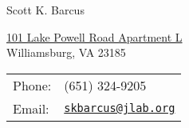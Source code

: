 \documentclass[letterpaper,10pt]{article}
\def\name{Scott K. Barcus}
\begin{document}
\renewcommand{\baselinestretch}{0.0}{
{\huge \name}


\vspace{0.25in}

\begin{minipage}{0.45\linewidth}
  \href{http://www.wm.edu/}{101 Lake Powell Road Apartment L} \\
  Williamsburg, VA 23185 \\
\end{minipage}
\begin{minipage}{0.45\linewidth}
  \begin{tabular}{ll}
    Phone: & (651) 324-9205 \\
    Email: & \href{mailto:me@email.wm.edu}{\tt skbarcus@jlab.org} \\
  \end{tabular}
\end{minipage}




}
\end{document}
